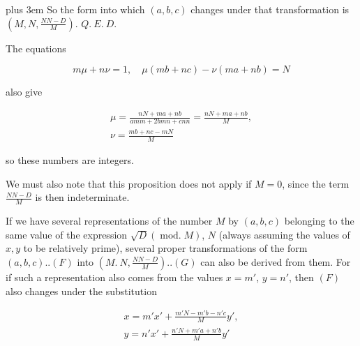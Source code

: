 \begingroup\rightskip=0pt plus 3em\relax
So the form into which $(a,b,c)$ changes under that transformation is $(M,N,\frac{NN-D}{M})$. $Q.\ E.\ D.$
\par\endgroup

The equations

\[
m\mu+n\nu=1,\quad \mu(mb+nc)-\nu(ma+nb)=N
\]

also give

\[
\begin{gathered}\mu=\frac{nN+ma+nb}{amm+2bmn+cnn}=\frac{nN+ma+nb}{M},\\\nu=\frac{mb+nc-mN}{M}\end{gathered}
\]

so these numbers are integers.

We must also note that this proposition does not apply if $M=0$, since the term $\frac{NN-D}{M}$ is then indeterminate.


If we have several representations of the number $M$ by $(a,b,c)$ belonging to the same value of the expression $\surd D(\operatorname{mod.}M)$, $N$ (always assuming the values of $x,y$ to be relatively prime), several proper transformations of the form $(a,b,c)..(F)$ into $(M.\ N,\frac{NN-D}{M})..(G)$ can also be derived from them. For if such a representation also comes from the values $x=m'$, $y=n'$, then $(F)$ also changes under the substitution


\[
\begin{gathered}x=m'x'+\frac{m'N-m'b-n'c}{M}y',\\y=n'x'+\frac{n'N+m'a+n'b}{M}y'\end{gathered}
\]

